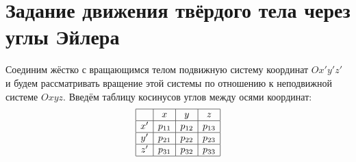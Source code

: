 \section{Задание движения твёрдого тела через углы Эйлера}

\begin{figure}[H]
  \centering

  \caption{}
  \label{fig:19_1}
\end{figure}

Соединим жёстко с вращающимся телом подвижную систему координат $Ox'y'z'$ и
будем рассматривать вращение этой системы по отношению к неподвижной системе
$Oxyz$. Введём таблицу косинусов углов между осями координат:
\begin{equation*}
  \begin{array}{|c|c|c|c|}
    \hline
    & x & y & z \\
    \hline
    x' & p_{11} & p_{12} & p_{13} \\
    \hline
    y' & p_{21} & p_{22} & p_{23} \\
    \hline
    z' & p_{31} & p_{32} & p_{33} \\
    \hline
  \end{array}
\end{equation*}

